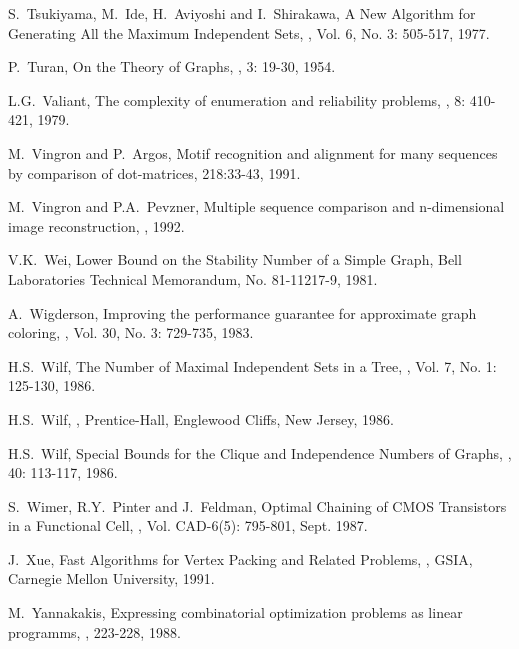 \begin{thebibliography}{10}
S.~Tsukiyama, M.~Ide, H.~Aviyoshi and I.~Shirakawa,
\newblock A New Algorithm for Generating All the Maximum Independent
Sets,
, Vol. 6, No. 3: 505-517, 1977.

P.~Turan,
\newblock On the Theory of Graphs,
, 3: 19-30, 1954.

L.G.~Valiant,
\newblock The complexity of enumeration and reliability problems,
, 8: 410-421, 1979.

M.~Vingron and P.~Argos,
\newblock Motif recognition and alignment for many sequences by  
comparison of dot-matrices,
 218:33-43, 1991.

M.~Vingron and P.A.~Pevzner,
\newblock Multiple sequence comparison and n-dimensional image  
reconstruction,
, 1992.

V.K.~Wei,
\newblock Lower Bound on the Stability Number of a Simple Graph,
\newblock Bell Laboratories Technical Memorandum, No. 81-11217-9,
1981.

A.~Wigderson,
\newblock Improving the performance guarantee for approximate graph 
coloring,
,
Vol. 30, No. 3: 729-735, 1983.

H.S.~Wilf,
\newblock The Number of Maximal Independent Sets in a Tree,
, Vol. 7, No. 1: 125-130,
1986.

H.S.~Wilf,
,
\newblock Prentice-Hall, Englewood Cliffs, New Jersey, 1986.

H.S.~Wilf,
\newblock Special Bounds for the Clique and Independence Numbers of
Graphs,
, 40: 113-117, 1986.

S.~Wimer, R.Y.~Pinter and J.~Feldman,
\newblock Optimal Chaining of CMOS Transistors in a Functional Cell,
, Vol. CAD-6(5): 795-801, Sept. 1987.

J.~Xue,
\newblock Fast Algorithms for Vertex Packing and Related Problems,
, GSIA, Carnegie Mellon University, 1991.

M.~Yannakakis,
\newblock Expressing combinatorial optimization problems as linear
programms,
, 223-228,
1988.


\end{thebibliography}
